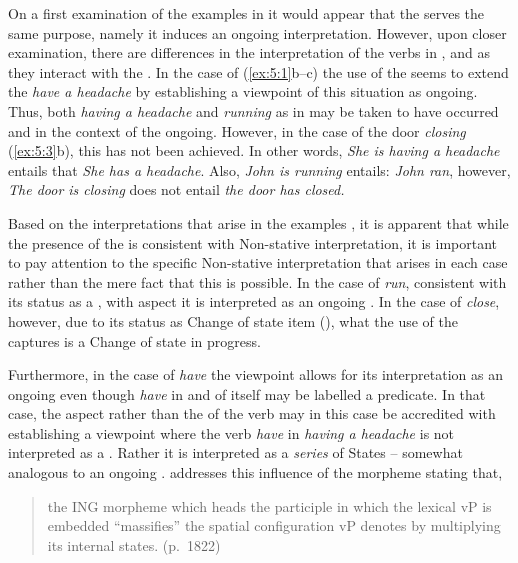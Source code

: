 On a first examination of the examples in  it would appear that the  serves the same purpose, namely it induces an ongoing  interpretation. However, upon closer examination, there are differences in the interpretation of the verbs in ,  and  as they interact with the . In the case of (\ref{ex:5:1}b--c) the use of the  seems to extend the  \textit{have a headache} by establishing a viewpoint of this situation as ongoing. Thus, both \textit{having a headache} and \textit{running} as in  may be taken to have occurred and in the context of the  ongoing. However, in the case of the door \textit{closing} (\ref{ex:5:3}b), this has not been achieved. In other words, \textit{She is having a headache} entails that \textit{She has a headache}. Also, \textit{John is running} entails: \textit{John ran}, however, \textit{The door is closing} does not entail \textit{the door has closed.} 

Based on the interpretations that arise in the examples , it is apparent that while the presence of the  is consistent with Non-stative interpretation, it is important to pay attention to the specific Non-stative interpretation that arises in each case rather than the mere fact that this is possible. In the case of \textit{run}, consistent with its status as a , with  aspect it is interpreted as an ongoing . In the case of \textit{close}, however, due to its status as Change of state item (), what the use of the  captures is a Change of state in progress. 

Furthermore, in the case of \textit{have} the  viewpoint allows for its interpretation as an ongoing  even though \textit{have} in and of itself may be labelled a  predicate. In that case, the  aspect rather than the  of the verb may in this case be accredited with establishing a viewpoint where the verb \textit{have} in \textit{having a headache} is not interpreted as a . Rather it is interpreted as a \textit{series} of States -- somewhat analogous to an ongoing . \citet{Guéron2008} addresses this influence of the  morpheme stating that, 

\begin{quote}
the ING morpheme which heads the participle in which the lexical vP is embedded ``massifies'' the spatial configuration vP denotes by multiplying its internal states. (p.~1822)
\end{quote}

